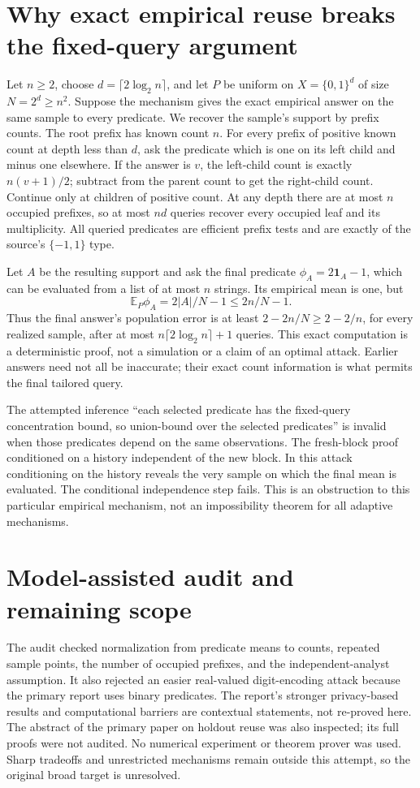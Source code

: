 \documentclass[11pt]{article}
\begin{document}
\section{Why exact empirical reuse breaks the fixed-query argument}
Let $n\ge2$, choose $d=\lceil2\log_2n\rceil$, and let $P$ be uniform on
$X=\{0,1\}^d$ of size $N=2^d\ge n^2$. Suppose the mechanism gives the
exact empirical answer on the same sample to every predicate.
We recover the sample's support by prefix counts. The root prefix has
known count $n$. For every prefix of positive known count at depth less
than $d$, ask the predicate which is one on its left child and minus
one elsewhere. If the answer is $v$, the left-child count is exactly
$n(v+1)/2$; subtract from the parent count to get the right-child count.
Continue only at children of positive count. At any depth there are at
most $n$ occupied prefixes, so at most $nd$ queries recover every occupied
leaf and its multiplicity. All queried predicates are efficient prefix
tests and are exactly of the source's $\{-1,1\}$ type.

Let $A$ be the resulting support and ask the final predicate
$\phi_A=2\mathbf1_A-1$, which can be evaluated from a list of at most
$n$ strings. Its empirical mean is one, but
\[
\mathbb E_P\phi_A=2|A|/N-1\le2n/N-1.
\]
Thus the final answer's population error is at least
$2-2n/N\ge2-2/n$, for every realized sample, after at most
$n\lceil2\log_2n\rceil+1$ queries. This exact computation is a
deterministic proof, not a simulation or a claim of an optimal attack.
Earlier answers need not all be inaccurate; their exact count information
is what permits the final tailored query.

The attempted inference ``each selected predicate has the fixed-query
concentration bound, so union-bound over the selected predicates'' is
invalid when those predicates depend on the same observations.
The fresh-block proof conditioned on a history independent of the new
block. In this attack conditioning on the history reveals the very sample
on which the final mean is evaluated. The conditional independence step
fails. This is an obstruction to this particular empirical mechanism,
not an impossibility theorem for all adaptive mechanisms.

\section{Model-assisted audit and remaining scope}
The audit checked normalization from predicate means to counts, repeated
sample points, the number of occupied prefixes, and the independent-analyst
assumption. It also rejected an easier real-valued digit-encoding attack
because the primary report uses binary predicates. The report's stronger
privacy-based results and computational barriers are contextual statements,
not re-proved here. The abstract of the primary paper on holdout reuse was
also inspected; its full proofs were not audited. No numerical experiment
or theorem prover was used. Sharp tradeoffs and unrestricted mechanisms
remain outside this attempt, so the original broad target is unresolved.
\end{document}

